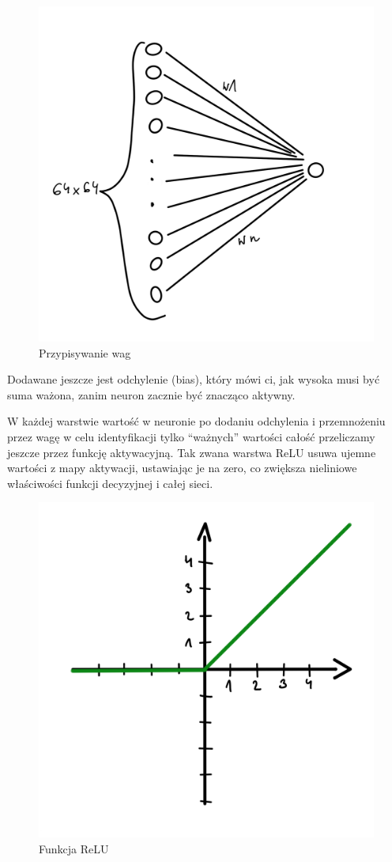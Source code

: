 \documentclass[brudnopis]{xmgr}
\begin{document}
\begin{figure}[!tbh]
\centering
\includegraphics[width=.8\hsize]{fig/3}
\caption{Przypisywanie wag\label{RYS.3}}
\end{figure}



Dodawane jeszcze jest odchylenie (bias), który mówi ci, jak wysoka musi być suma ważona, zanim neuron zacznie być znacząco aktywny.

W każdej warstwie  wartość w neuronie po dodaniu odchylenia i przemnożeniu przez wagę w celu identyfikacji tylko “ważnych” wartości całość przeliczamy jeszcze przez funkcję aktywacyjną. 
Tak zwana warstwa ReLU usuwa ujemne wartości z mapy aktywacji, ustawiając je na zero, co zwiększa nieliniowe właściwości funkcji decyzyjnej i całej sieci.

\begin{figure}[!tbh]
\centering
\includegraphics[width=.8\hsize]{fig/4}
\caption{Funkcja ReLU\label{RYS.4}}
\end{figure}
\end{document}
